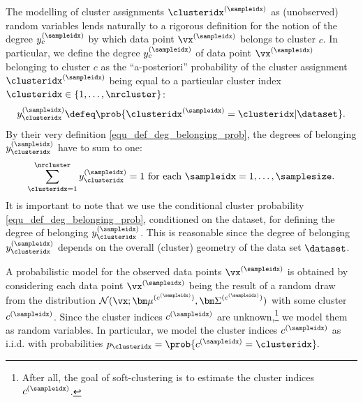 \documentclass[12pt]{report}
\begin{document}
The modelling of cluster assignments $\clusteridx^{(\sampleidx)}$ as (unobserved) random variables lends naturally  
to a rigorous definition for the notion of the degree $y^{(\sampleidx)}_{c}$ by which data point $\vx^{(\sampleidx)}$ belongs to cluster $c$. 
In particular, we define the degree $y^{(\sampleidx)}_{c}$ of data point $\vx^{(\sampleidx)}$ belonging to cluster $c$ as the ``a-posteriori'' probability 
of the cluster assignment $\clusteridx^{(\sampleidx)}$ being equal to a particular cluster index $\clusteridx \in \{1,\ldots,\nrcluster\}$: 
\begin{equation}
\label{equ_def_deg_belonging_prob}
y^{(\sampleidx)}_{\clusteridx} \defeq \prob{ \clusteridx^{(\sampleidx)} = \clusteridx | \dataset}.
\end{equation} 
By their very definition \eqref{equ_def_deg_belonging_prob}, the degrees of belonging $y^{(\sampleidx)}_{\clusteridx}$ have to sum 
to one: 
\begin{equation} 
\label{equ_dob_sum_to_one}
\sum_{\clusteridx=1}^{\nrcluster} y^{(\sampleidx)}_{\clusteridx}=1 \mbox{ for each } \sampleidx=1,\ldots,\samplesize.
\end{equation}  
It is important to note that we use the conditional cluster probability \eqref{equ_def_deg_belonging_prob}, conditioned on the 
dataset, for defining the degree of belonging $y^{(\sampleidx)}_{\clusteridx}$. This is reasonable since the degree of belonging 
$y^{(\sampleidx)}_{\clusteridx}$ depends on the overall (cluster) geometry of the data set $\dataset$.

A probabilistic model for the observed data points $\vx^{(\sampleidx)}$ is obtained 
by considering each data point $\vx^{(\sampleidx)}$ being the result of a random 
draw from the distribution $\mathcal{N} (\vx ; {\bm \mu}^{(c^{(\sampleidx)})}, {\bm \Sigma}^{(c^{(\sampleidx)})})$ 
with some cluster $c^{(\sampleidx)}$. Since the cluster indices $c^{(\sampleidx)}$ are 
unknown,\footnote{After all, the goal of soft-clustering is to estimate the 
cluster indices $c^{(\sampleidx)}$.} we model them as random variables. 
In particular, we model the cluster indices $c^{(\sampleidx)}$ as i.i.d. with probabilities
$p_{\clusteridx} = \prob{ c^{(\sampleidx)} = \clusteridx}.$ 
\end{document}

